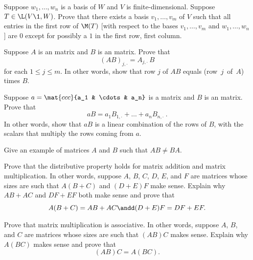 \exercise
Suppose $w_1, \dots, w_n$ is a basis of $W$ and $V$ is finite-dimensional. Suppose $T \in \L(V\1, W)$. Prove that there exists a basis $v_1, \dots, v_m$ of $V$ such that all entries in the first row of $\M(T)$ [with respect to the bases $v_1, \dots, v_m$ and $w_1, \dots, w_n$] are $0$ except for possibly a $1$ in the first row, first column.


\exercise
Suppose $A$ is an  matrix and $B$ is an  matrix. Prove that \label{3think1}
\[
(AB)_{j,\cdot} = A_{j,\cdot} \, B
\]
for each $1 \le j \le m$. In other words, show that row $j$ of $AB$ equals (row~$j$~of~$A$) times $B$.


\exercise
Suppose $a = \mat{ccc}{a_1 & \cdots & a_n}$ is a  matrix and $B$ is an  matrix. Prove that \label{3think2}
\[
aB = a_1 B_{1, \cdot} + \dots + a_n B_{n, \cdot}\ .
\]
In other words, show that $aB$ is a linear combination of the rows of $B$, with the scalars that multiply the rows coming from $a$.



\exercise
Give an example of  matrices $A$ and $B$ such that $AB \ne BA$. \label{noncommute}


\exercise
Prove that the distributive property holds for matrix addition and matrix
multiplication.  In other words, suppose $A$, $B$, $C$, $D$, $E$, and $F$ are matrices whose
sizes are such that $A(B+C)$ and $(D+E)F$ make sense.  Explain why $AB + AC$ and $DF + EF$ both make sense
and prove that\label{3distrib}
\[
A(B+C) = AB + AC \andd (D+E)F = DF + EF.
\]
\exercisedisplayend


\exercise
Prove that matrix multiplication is associative.  In other words, suppose $A$,
$B$, and $C$ are matrices whose sizes are such that $(AB)C$ makes sense.
Explain why $A(BC)$ makes sense and prove that\label{assoc} \[(AB)C = A(BC).\]


